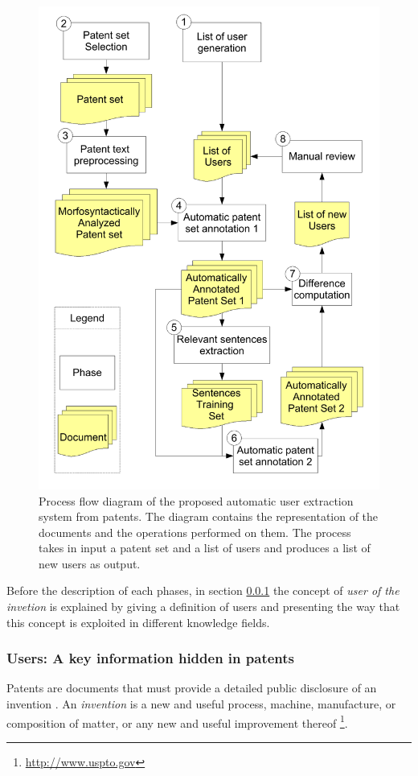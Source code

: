 \documentclass[]{book}
\let\rmarkdownfootnote\footnote%
\def\footnote{\protect\rmarkdownfootnote}
\begin{document}
\begin{figure}

{\centering \includegraphics[width=0.8\linewidth]{_bookdown_files/figures/Process} 

}

\caption{Process flow diagram of the proposed automatic user extraction system from patents. The diagram contains the representation of the documents and the operations performed on them. The process takes in input a patent set and a list of users and produces a list of new users as output.}\label{fig:procesuser}
\end{figure}

Before the description of each phases, in section \ref{userdef} the
concept of \emph{user of the invetion} is explained by giving a
definition of users and presenting the way that this concept is
exploited in different knowledge fields.

\subsubsection{Users: A key information hidden in
patents}\label{userdef}

Patents are documents that must provide a detailed public disclosure of
an invention \citep{wipo2}. An \emph{invention} is a new and useful
process, machine, manufacture, or composition of matter, or any new and
useful improvement thereof \footnote{\url{http://www.uspto.gov}}.
\end{document}
